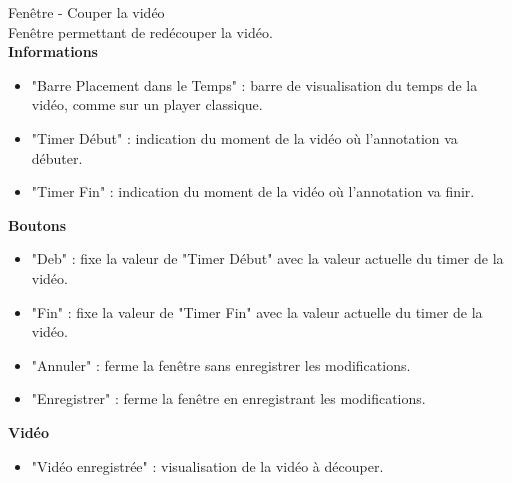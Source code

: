\documentclass[11pt,french,a4paper]{report}
\begin{document}
\Large Fenêtre - Couper la vidéo\normalsize \\
    Fenêtre permettant de redécouper la vidéo. \\
\large \textbf{Informations}\normalsize
    \begin{itemize}[label=, leftmargin=*,parsep=0cm,itemsep=0cm,topsep=0cm]
        \item "Barre Placement dans le Temps" : barre de visualisation du temps de la vidéo, comme sur un player classique.
        \item "Timer Début" : indication du moment de la vidéo où l'annotation va débuter.
        \item "Timer Fin" : indication du moment de la vidéo où l'annotation va finir.
    \end{itemize}
\large \textbf{Boutons}\normalsize
    \begin{itemize}[label=, leftmargin=*,parsep=0cm,itemsep=0cm,topsep=0cm]
        \item "Deb" : fixe la valeur de "Timer Début" avec la valeur actuelle du timer de la vidéo.
        \item "Fin" : fixe la valeur de "Timer Fin" avec la valeur actuelle du timer de la vidéo.
        \item "Annuler" : ferme la fenêtre sans enregistrer les modifications.
        \item "Enregistrer" : ferme la fenêtre en enregistrant les modifications.
    \end{itemize}
\large \textbf{Vidéo}\normalsize
    \begin{itemize}[label=, leftmargin=*,parsep=0cm,itemsep=0cm,topsep=0cm]
        \item "Vidéo enregistrée" : visualisation de la vidéo à découper.
    \end{itemize}

\dotfill \\
\end{document}
